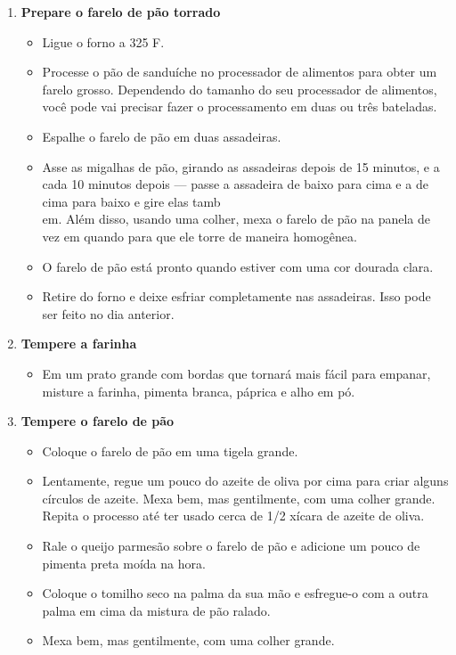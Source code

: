 \documentclass [11pt, papel de carta] {article}
\begin{document}
\begin {description}
\begin {enumerate}
\begin {itemize}
\end {itemize}
\item {\bf Prepare o farelo de pão torrado}
\begin {itemize}
\item Ligue o forno a 325 F.
\item Processe o pão de sanduíche  no processador de alimentos para obter um farelo grosso. Dependendo do tamanho do seu processador de alimentos, você pode vai precisar fazer o processamento em duas ou três bateladas.
\item Espalhe o farelo de p\~ao em duas assadeiras.
\item Asse as migalhas de pão, girando as assadeiras depois de 15 minutos, e a cada 10 minutos depois --- passe a assadeira de baixo para cima e a de cima para baixo e gire elas tamb\\em. Além disso, usando uma colher, mexa o farelo de pão na panela de vez em quando para que ele torre de maneira homog\^enea.
\item O farelo de pão est\'a pronto quando estiver com uma cor dourada clara.
\item Retire do forno e deixe esfriar completamente nas assadeiras. Isso pode ser feito no dia anterior.
\end {itemize}
\item {\bf Tempere a farinha}
\begin {itemize}
\item Em um prato grande com bordas que tornará mais fácil para empanar, misture a farinha, pimenta branca, páprica e alho em pó.
\end {itemize}
\item {\bf Tempere o farelo de pão}
\begin {itemize}
\item Coloque o farelo de pão em uma tigela grande.
\item Lentamente, regue um pouco do azeite de oliva por cima para criar alguns círculos de azeite. Mexa bem, mas gentilmente, com uma colher grande. Repita o processo até ter usado cerca de 1/2 xícara de azeite de oliva.
\item Rale o queijo parmesão sobre o farelo de p\~ao e adicione um pouco de pimenta preta mo\'ida na hora.
\item Coloque o tomilho seco na palma da sua mão e esfregue-o com a outra palma em cima da mistura de pão ralado.
\item Mexa bem, mas gentilmente, com uma colher grande.
\end {itemize}

\end{enumerate}
\end{description}
\end{document}
